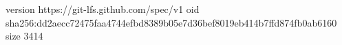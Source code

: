 version https://git-lfs.github.com/spec/v1
oid sha256:dd2aecc72475faa4744efbd8389b05e7d36bef8019eb414b7ffd874fb0ab6160
size 3414
